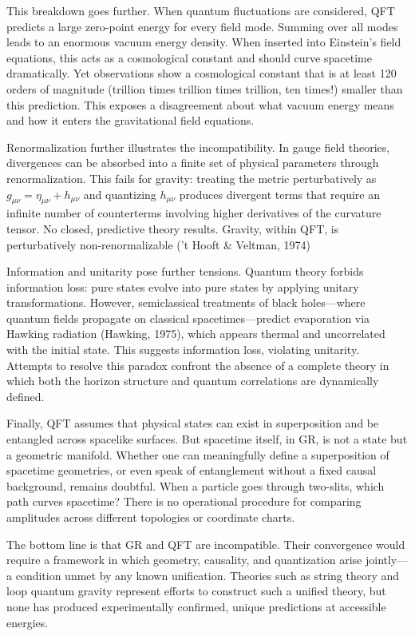 This breakdown goes further. When quantum fluctuations are considered, QFT predicts a large zero-point energy for every field mode. Summing over all modes leads to an enormous vacuum energy density. When inserted into Einstein’s field equations, this acts as a cosmological constant and should curve spacetime dramatically. Yet observations show a cosmological constant that is at least 120 orders of magnitude (trillion times trillion times trillion, ten times!) smaller than this prediction. This exposes a disagreement about what vacuum energy means and how it enters the gravitational field equations.

Renormalization further illustrates the incompatibility. In gauge field theories, divergences can be absorbed into a finite set of physical parameters through renormalization. This fails for gravity: treating the metric perturbatively as $g_{\mu\nu} = \eta_{\mu\nu} + h_{\mu\nu}$ and quantizing $h_{\mu\nu}$ produces divergent terms that require an infinite number of counterterms involving higher derivatives of the curvature tensor. No closed, predictive theory results. Gravity, within QFT, is perturbatively non-renormalizable ('t Hooft \& Veltman, 1974)

Information and unitarity pose further tensions. Quantum theory forbids information loss: pure states evolve into pure states by applying unitary transformations. However, semiclassical treatments of black holes—where quantum fields propagate on classical spacetimes—predict evaporation via Hawking radiation (Hawking, 1975), which appears thermal and uncorrelated with the initial state. This suggests information loss, violating unitarity. Attempts to resolve this paradox confront the absence of a complete theory in which both the horizon structure and quantum correlations are dynamically defined.

Finally, QFT assumes that physical states can exist in superposition and be entangled across spacelike surfaces. But spacetime itself, in GR, is not a state but a geometric manifold. Whether one can meaningfully define a superposition of spacetime geometries, or even speak of entanglement without a fixed causal background, remains doubtful. When a particle goes through two-slits, which path curves spacetime? There is no operational procedure for comparing amplitudes across different topologies or coordinate charts.

The bottom line is that GR and QFT are incompatible. Their convergence would require a framework in which geometry, causality, and quantization arise jointly—a condition unmet by any known unification. Theories such as string theory and loop quantum gravity represent efforts to construct such a unified theory, but none has produced experimentally confirmed, unique predictions at accessible energies.

